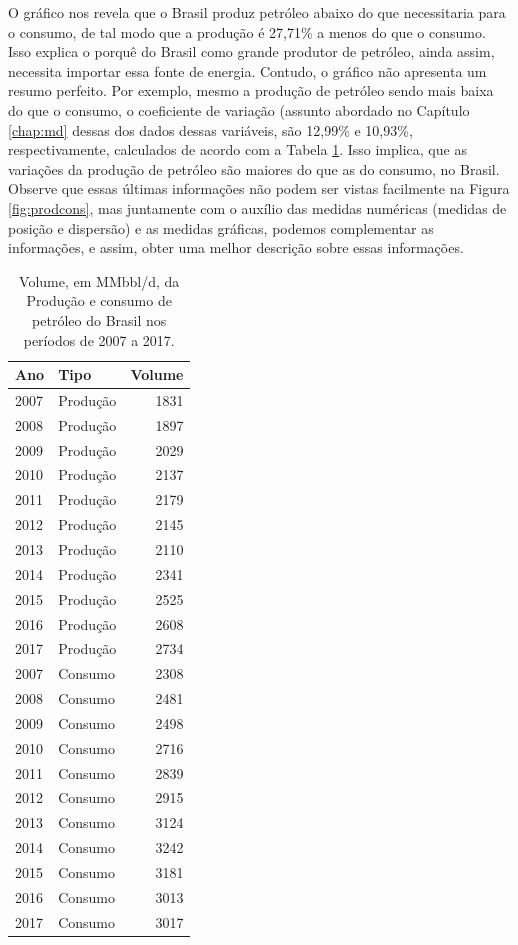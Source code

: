\documentclass[
]{book}
\begin{document}
O gráfico nos revela que o Brasil produz petróleo abaixo do que necessitaria para o consumo, de tal modo que a produção é 27,71\% a menos do que o consumo. Isso explica o porquê do Brasil como grande produtor de petróleo, ainda assim, necessita importar essa fonte de energia. Contudo, o gráfico não apresenta um resumo perfeito. Por exemplo, mesmo a produção de petróleo sendo mais baixa do que o consumo, o coeficiente de variação (assunto abordado no Capítulo \ref{chap:md} dessas dos dados dessas variáveis, são 12,99\% e 10,93\%, respectivamente, calculados de acordo com a Tabela \ref{tab:prodcons2}. Isso implica, que as variações da produção de petróleo são maiores do que as do consumo, no Brasil. Observe que essas últimas informações não podem ser vistas facilmente na Figura \ref{fig:prodcons}, mas juntamente com o auxílio das medidas numéricas (medidas de posição e dispersão) e as medidas gráficas, podemos complementar as informações, e assim, obter uma melhor descrição sobre essas informações.

\begin{table}

\caption{\label{tab:prodcons2}Volume, em MMbbl/d, da Produção e consumo de petróleo do Brasil nos períodos de 2007 a 2017.}
\centering
\begin{tabular}[t]{l|l|r}
\hline
Ano & Tipo & Volume\\
\hline
2007 & Produção & 1831\\
\hline
2008 & Produção & 1897\\
\hline
2009 & Produção & 2029\\
\hline
2010 & Produção & 2137\\
\hline
2011 & Produção & 2179\\
\hline
2012 & Produção & 2145\\
\hline
2013 & Produção & 2110\\
\hline
2014 & Produção & 2341\\
\hline
2015 & Produção & 2525\\
\hline
2016 & Produção & 2608\\
\hline
2017 & Produção & 2734\\
\hline
2007 & Consumo & 2308\\
\hline
2008 & Consumo & 2481\\
\hline
2009 & Consumo & 2498\\
\hline
2010 & Consumo & 2716\\
\hline
2011 & Consumo & 2839\\
\hline
2012 & Consumo & 2915\\
\hline
2013 & Consumo & 3124\\
\hline
2014 & Consumo & 3242\\
\hline
2015 & Consumo & 3181\\
\hline
2016 & Consumo & 3013\\
\hline
2017 & Consumo & 3017\\
\hline
\end{tabular}
\end{table}
\end{document}
